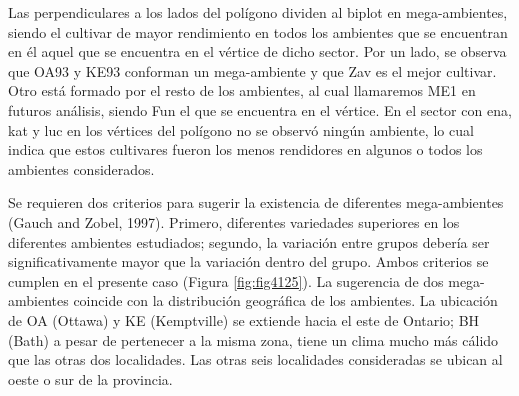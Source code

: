 Las perpendiculares a los lados del polígono dividen al biplot en mega-ambientes, siendo el cultivar de mayor rendimiento en todos los ambientes que se encuentran en él aquel que se encuentra en el vértice de dicho sector. Por un lado, se observa que OA93 y KE93 conforman un mega-ambiente y que Zav es el mejor cultivar. Otro está formado por el resto de los ambientes, al cual llamaremos ME1 en futuros análisis, siendo Fun el que se encuentra en el vértice. En el sector con ena, kat y luc en los vértices del polígono no se observó ningún ambiente, lo cual indica que estos cultivares fueron los menos rendidores en algunos o todos los ambientes considerados.

Se requieren dos criterios para sugerir la existencia de diferentes mega-ambientes (Gauch and Zobel, 1997). Primero, diferentes variedades superiores en los diferentes ambientes estudiados; segundo, la variación entre grupos debería ser significativamente mayor que la variación dentro del grupo.  Ambos criterios se cumplen en el presente caso (Figura \ref{fig:fig4125}). La sugerencia de dos mega-ambientes coincide con la distribución geográfica de los ambientes. La ubicación de OA (Ottawa) y KE (Kemptville) se extiende hacia el este de Ontario; BH (Bath) a pesar de pertenecer a la misma zona, tiene un clima mucho más cálido que las otras dos localidades. Las otras seis localidades consideradas se ubican al oeste o sur de la provincia.


